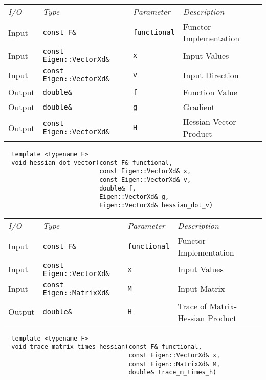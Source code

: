 \begin{tcolorbox}[colback=white,colframe=gray90, coltitle=black,boxrule=3pt,
fonttitle=\bfseries,title=Hessian-Vector Product]

\begin{tabular}{llll}
\textit{I/O} & \textit{Type} & \textit{Parameter} & \textit{Description} \\
Input & \texttt{const F\&} & \texttt{functional} & Functor Implementation \\
Input & \texttt{const Eigen::VectorXd\&} & \texttt{x} & Input Values \\
Input & \texttt{const Eigen::VectorXd\&} & \texttt{v} & Input Direction \\
Output & \texttt{double\&} & \texttt{f} & Function Value \\
Output & \texttt{double\&} & \texttt{g} & Gradient \\
Output & \texttt{const Eigen::VectorXd\&} & \texttt{H} & Hessian-Vector Product
\end{tabular}

\vspace{5mm}

\begin{verbatim}
  template <typename F>
  void hessian_dot_vector(const F& functional,
                          const Eigen::VectorXd& x,
                          const Eigen::VectorXd& v,
                          double& f,
                          Eigen::VectorXd& g,
                          Eigen::VectorXd& hessian_dot_v)
\end{verbatim}

\end{tcolorbox}

\begin{tcolorbox}[colback=white,colframe=gray90, coltitle=black,boxrule=3pt,
fonttitle=\bfseries,title=Trace of Matrix-Hessian Product]

\begin{tabular}{llll}
\textit{I/O} & \textit{Type} & \textit{Parameter} & \textit{Description} \\
Input & \texttt{const F\&} & \texttt{functional} & Functor Implementation \\
Input & \texttt{const Eigen::VectorXd\&} & \texttt{x} & Input Values \\
Input & \texttt{const Eigen::MatrixXd\&} & \texttt{M} & Input Matrix \\
Output & \texttt{double\&} & \texttt{H} & Trace of Matrix-Hessian Product
\end{tabular}

\vspace{5mm}

\begin{verbatim}
  template <typename F>
  void trace_matrix_times_hessian(const F& functional,
                                  const Eigen::VectorXd& x,
                                  const Eigen::MatrixXd& M,
                                  double& trace_m_times_h)
\end{verbatim}

\end{tcolorbox}

